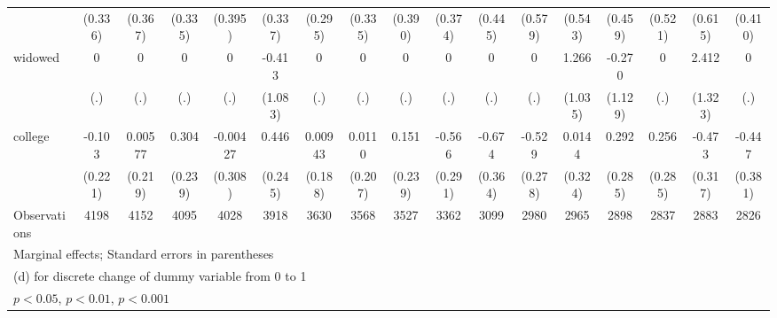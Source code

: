 {\begin{tabular}{l*{16}{c}}
                    &     (0.336)         &     (0.367)         &     (0.335)         &     (0.395)         &     (0.337)         &     (0.295)         &     (0.335)         &     (0.390)         &     (0.374)         &     (0.445)         &     (0.579)         &     (0.543)         &     (0.459)         &     (0.521)         &     (0.615)         &     (0.410)         \\
[1em]
widowed             &           0         &           0         &           0         &           0         &      -0.413         &           0         &           0         &           0         &           0         &           0         &           0         &       1.266         &      -0.270         &           0         &       2.412         &           0         \\
                    &         (.)         &         (.)         &         (.)         &         (.)         &     (1.083)         &         (.)         &         (.)         &         (.)         &         (.)         &         (.)         &         (.)         &     (1.035)         &     (1.129)         &         (.)         &     (1.323)         &         (.)         \\
[1em]
college             &      -0.103         &     0.00577         &       0.304         &    -0.00427         &       0.446         &     0.00943         &      0.0110         &       0.151         &      -0.566         &      -0.674         &      -0.529         &      0.0144         &       0.292         &       0.256         &      -0.473         &      -0.447         \\
                    &     (0.221)         &     (0.219)         &     (0.239)         &     (0.308)         &     (0.245)         &     (0.188)         &     (0.207)         &     (0.239)         &     (0.291)         &     (0.364)         &     (0.278)         &     (0.324)         &     (0.285)         &     (0.285)         &     (0.317)         &     (0.381)         \\
\hline
Observations        &        4198         &        4152         &        4095         &        4028         &        3918         &        3630         &        3568         &        3527         &        3362         &        3099         &        2980         &        2965         &        2898         &        2837         &        2883         &        2826         \\
\hline\hline
\multicolumn{17}{l}{\footnotesize Marginal effects; Standard errors in parentheses}\\
\multicolumn{17}{l}{\footnotesize  (d) for discrete change of dummy variable from 0 to 1}\\
\multicolumn{17}{l}{\footnotesize \sym{*} \(p<0.05\), \sym{**} \(p<0.01\), \sym{***} \(p<0.001\)}\\
\end{tabular}
}
